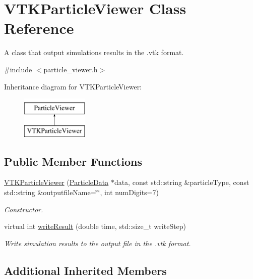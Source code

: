 \hypertarget{classVTKParticleViewer}{\section{V\-T\-K\-Particle\-Viewer Class Reference}
\label{classVTKParticleViewer}
}


A class that output simulations results in the .vtk format.  




{\ttfamily \#include $<$particle\-\_\-viewer.\-h$>$}

Inheritance diagram for V\-T\-K\-Particle\-Viewer\-:\begin{figure}[H]
\begin{center}
\leavevmode
\includegraphics[height=2.000000cm]{classVTKParticleViewer}
\end{center}
\end{figure}
\subsection*{Public Member Functions}
\begin{DoxyCompactItemize}
\item 
\hyperlink{classVTKParticleViewer_a3b3f367478a14d3f849e515e84cd48fb}{V\-T\-K\-Particle\-Viewer} (\hyperlink{classParticleData}{Particle\-Data} $\ast$data, const std\-::string \&particle\-Type, const std\-::string \&outputfile\-Name=\char`\"{}\char`\"{}, int num\-Digits=7)
\begin{DoxyCompactList}\small\item\em Constructor. \end{DoxyCompactList}\item 
virtual int \hyperlink{classVTKParticleViewer_a45efc6692f3d8d7178f456cfb7779c88}{write\-Result} (double time, std\-::size\-\_\-t write\-Step)
\begin{DoxyCompactList}\small\item\em Write simulation results to the output file in the .vtk format. \end{DoxyCompactList}\end{DoxyCompactItemize}
\subsection*{Additional Inherited Members}


